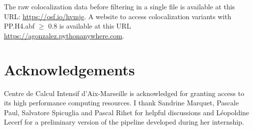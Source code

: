 The raw colocalization data before filtering in a single file is available at this URL: \url{https://osf.io/hvmje}.
%
A website to access colocalization variants with PP.H4.abf $\geq$ 0.8 is available at this URL \url{https://agonzalez.pythonanywhere.com}.

\section*{Acknowledgements}

Centre de Calcul Intensif d'Aix-Marseille is acknowledged for granting access to its high performance computing resources.
%
I thank Sandrine Marquet, Pascale Paul, Salvatore Spicuglia and Pascal Rihet for helpful discussions and L\'eopoldine Lecerf for a preliminary version of the pipeline developed during her internship.

